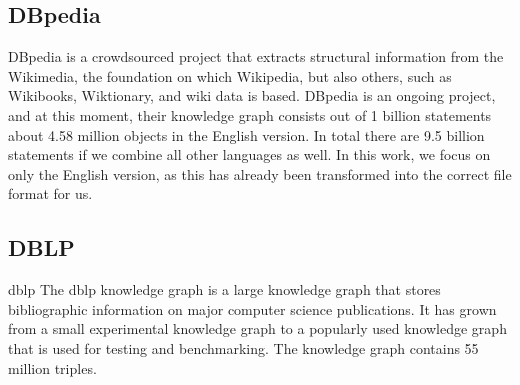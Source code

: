 \documentclass[11pt,letterpaper ,oneside ]{book}
\begin{document}
	\subsection{DBpedia}
	DBpedia\cite{DBpedia} is a crowdsourced project that extracts structural information from the Wikimedia, the foundation on which Wikipedia, but also others, such as Wikibooks, Wiktionary, and wiki data is based. DBpedia is an ongoing project, and at this moment, their knowledge graph consists out of 1 billion statements about 4.58 million objects in the English version. In total there are 9.5 billion statements if we combine all other languages as well. In this work, we focus on only the English version, as this has already been transformed into the correct file format for us. 
	\begin{figure}[!t]
	\end{figure}
	
	\subsection{DBLP}
	dblp\cite{DBLP} The dblp knowledge graph is a large knowledge graph that stores bibliographic information on major computer science publications. It has grown from a small experimental knowledge graph to a popularly used knowledge graph that is used for testing and benchmarking. The knowledge graph contains 55 million triples.
	
\end{document}
